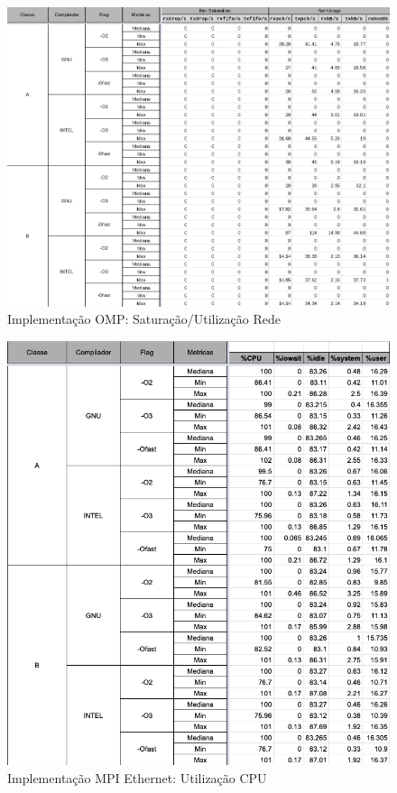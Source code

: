 \documentclass{article}
\begin{document}
\begin{appendices}
\begin{figure}[H]
    \centering
    \includegraphics[width=12cm]{Pictures/LUMZ_r431_OMP_NET.png}
    \caption{Implementação OMP: Saturação/Utilização Rede}
    \label{figure:LUMZ_r431_OMP_NET}
\end{figure}

\begin{figure}[H]
    \centering
    \includegraphics[width=12cm]{Pictures/LUMZ_r431_MPIE_CPU.png}
    \caption{Implementação MPI Ethernet: Utilização CPU}
    \label{figure:LUMZ_r431_MPIE_CPU}
\end{figure}


\end{appendices}
\end{document}
